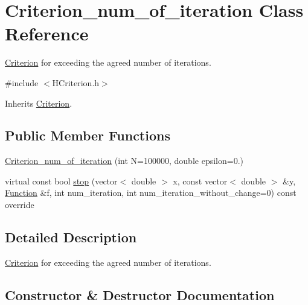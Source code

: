 \hypertarget{class_criterion__num__of__iteration}{}\section{Criterion\+\_\+num\+\_\+of\+\_\+iteration Class Reference}
\label{class_criterion__num__of__iteration}


\hyperlink{class_criterion}{Criterion} for exceeding the agreed number of iterations.  




{\ttfamily \#include $<$H\+Criterion.\+h$>$}



Inherits \hyperlink{class_criterion}{Criterion}.

\subsection*{Public Member Functions}
\begin{DoxyCompactItemize}
\item 
\hyperlink{class_criterion__num__of__iteration_ad76d82b30fe6f277e0898153456f47a8}{Criterion\+\_\+num\+\_\+of\+\_\+iteration} (int N=100000, double epsilon=0.)
\item 
virtual const bool \hyperlink{class_criterion__num__of__iteration_a6566342d95827d9350485498c6c4eba6}{stop} (vector$<$ double $>$ x, const vector$<$ double $>$ \&y, \hyperlink{class_function}{Function} \&f, int num\+\_\+iteration, int num\+\_\+iteration\+\_\+without\+\_\+change=0) const override
\end{DoxyCompactItemize}


\subsection{Detailed Description}
\hyperlink{class_criterion}{Criterion} for exceeding the agreed number of iterations. 

\subsection{Constructor \& Destructor Documentation}
\mbox{\label{class_criterion__num__of__iteration_ad76d82b30fe6f277e0898153456f47a8}} 
